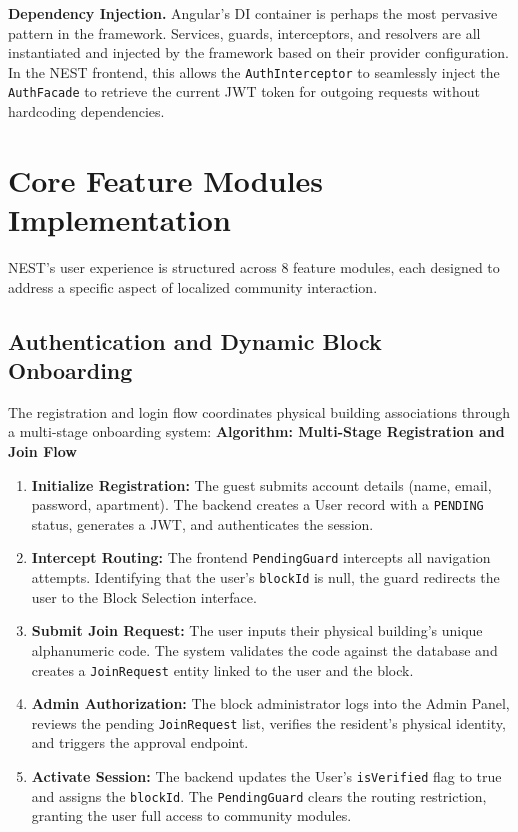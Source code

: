 \textbf{Dependency Injection.} Angular's DI container is perhaps the most pervasive pattern in the framework. Services, guards, interceptors, and resolvers are all instantiated and injected by the framework based on their provider configuration. In the NEST frontend, this allows the \texttt{AuthInterceptor} to seamlessly inject the \texttt{AuthFacade} to retrieve the current JWT token for outgoing requests without hardcoding dependencies.

\section{Core Feature Modules Implementation}
NEST's user experience is structured across 8 feature modules, each designed to address a specific aspect of localized community interaction.

\subsection{Authentication and Dynamic Block Onboarding}
The registration and login flow coordinates physical building associations through a multi-stage onboarding system:
\textbf{Algorithm: Multi-Stage Registration and Join Flow}
\begin{enumerate}[label=\textbf{Step \arabic*:}, leftmargin=*]
    \item \textbf{Initialize Registration:} The guest submits account details (name, email, password, apartment). The backend creates a User record with a \texttt{PENDING} status, generates a JWT, and authenticates the session.
    \item \textbf{Intercept Routing:} The frontend \texttt{PendingGuard} intercepts all navigation attempts. Identifying that the user's \texttt{blockId} is null, the guard redirects the user to the Block Selection interface.
    \item \textbf{Submit Join Request:} The user inputs their physical building's unique alphanumeric code. The system validates the code against the database and creates a \texttt{JoinRequest} entity linked to the user and the block.
    \item \textbf{Admin Authorization:} The block administrator logs into the Admin Panel, reviews the pending \texttt{JoinRequest} list, verifies the resident's physical identity, and triggers the approval endpoint.
    \item \textbf{Activate Session:} The backend updates the User's \texttt{isVerified} flag to true and assigns the \texttt{blockId}. The \texttt{PendingGuard} clears the routing restriction, granting the user full access to community modules.
\end{enumerate}

